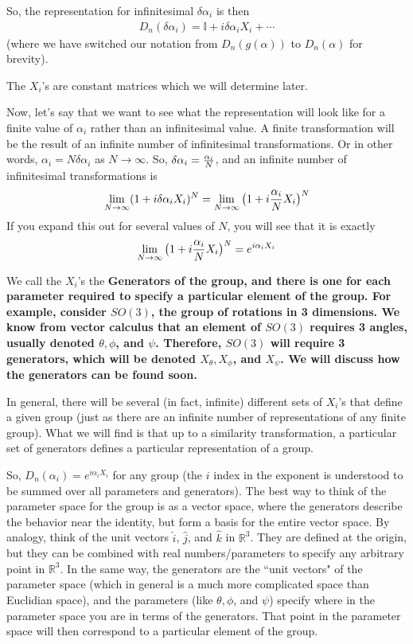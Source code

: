 \documentclass[12pt,epsf]{article}
\def\nolabel{\nonumber }
\def\nolabel{\nonumber }
\begin{document}
So, the representation for infinitesimal $\delta \alpha_i$ is then
\begin{eqnarray}
D_n(\delta \alpha_i) = \mathbb{I}+ i \delta \alpha_i X_i +
\cdots\nolabel 
\end{eqnarray}
(where we have switched our notation from $D_n(g(\alpha))$ to
$D_n(\alpha)$ for brevity).  

The $X_i$'s are constant matrices which we will determine later.  

Now, let's say that we want to see what the representation will look
like for a finite value of $\alpha_i$ rather than an infinitesimal
value.	A finite transformation will be the result of an infinite
number of infinitesimal transformations.  Or in other words, $\alpha_i
= N \delta \alpha_i$ as $N \rightarrow \infty$.  So, $\delta \alpha_i =
{\alpha_i \over N}$, and an infinite number of infinitesimal
transformations is 
\begin{eqnarray}
\lim_{N\rightarrow \infty} (1+i\delta\alpha_i X_i)^N =
\lim_{N\rightarrow \infty}\big(1+i{\alpha_i \over N} X_i\big)^N\nolabel 
\end{eqnarray}
If you expand this out for several values of $N$, you will see that it
is exactly
\begin{eqnarray}
\lim_{N\rightarrow \infty}\big(1+i{\alpha_i \over N}X_i\big)^N =
e^{i\alpha_i X_i}\nolabel 
\end{eqnarray}

We call the $X_i$'s the \bf Generators \rm of the group, and there is
one for each parameter required to specify a particular element of the
group.	For example, consider $SO(3)$, the group of rotations in
3 dimensions.  We know from vector calculus that an element of
$SO(3)$ requires 3 angles, usually denoted $\theta, \phi$, and
$\psi$.  Therefore, $SO(3)$ will require 3 generators, which will be
denoted $X_{\theta}, X_{\phi}$, and $X_{\psi}$.  We will discuss how the
generators can be found soon.	

In general, there will be several (in fact, infinite) different sets of
$X_i$'s that define a given group (just as there are an infinite
number of representations of any finite group).  What we will find is
that up to a similarity transformation, a particular set of generators
defines a particular representation of a group.  

So, $D_n(\alpha_i) = e^{i\alpha_iX_i}$ for any group (the $i$ index in
the exponent is understood to be summed over all parameters and
generators).  The best way to think of the parameter space for the
group is as a vector space, where the generators describe the behavior
near the identity, but form a basis for the entire vector space.  By
analogy, think of the unit vectors $\hat i$, $\hat j$, and $\hat k$ in
$\mathbb{R}^3$.  They are defined at the origin, but they can be
combined with real numbers/parameters to specify any arbitrary point in
$\mathbb{R}^3$.  In the same way, the generators are the ``unit
vectors" of the parameter space (which in general is a much more
complicated space than Euclidian space), and the parameters (like
$\theta, \phi$, and $\psi$) specify where in the parameter space you
are in terms of the generators.  That point in the parameter space will
then correspond to a particular element of the group.  
\end{document}
